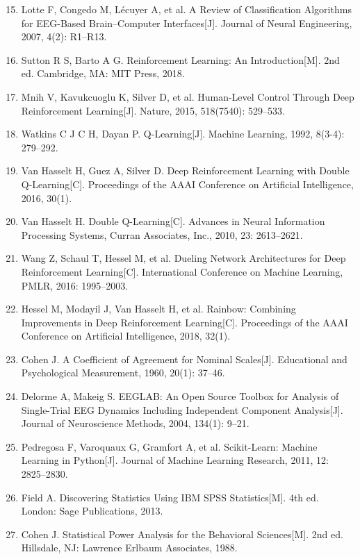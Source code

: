 \documentclass[12pt,a4paper]{ctexart}
\begin{document}
\begin{enumerate}
  \setcounter{enumi}{14}
  \item Lotte F, Congedo M, Lécuyer A, et al. A Review of Classification Algorithms for EEG-Based Brain--Computer Interfaces[J]. Journal of Neural Engineering, 2007, 4(2): R1--R13.
  \item Sutton R S, Barto A G. Reinforcement Learning: An Introduction[M]. 2nd ed. Cambridge, MA: MIT Press, 2018.
  \item Mnih V, Kavukcuoglu K, Silver D, et al. Human-Level Control Through Deep Reinforcement Learning[J]. Nature, 2015, 518(7540): 529--533.
  \item Watkins C J C H, Dayan P. Q-Learning[J]. Machine Learning, 1992, 8(3-4): 279--292.
  \item Van Hasselt H, Guez A, Silver D. Deep Reinforcement Learning with Double Q-Learning[C]. Proceedings of the AAAI Conference on Artificial Intelligence, 2016, 30(1).
  \item Van Hasselt H. Double Q-Learning[C]. Advances in Neural Information Processing Systems, Curran Associates, Inc., 2010, 23: 2613--2621.
  \item Wang Z, Schaul T, Hessel M, et al. Dueling Network Architectures for Deep Reinforcement Learning[C]. International Conference on Machine Learning, PMLR, 2016: 1995--2003.
  \item Hessel M, Modayil J, Van Hasselt H, et al. Rainbow: Combining Improvements in Deep Reinforcement Learning[C]. Proceedings of the AAAI Conference on Artificial Intelligence, 2018, 32(1).
  \item Cohen J. A Coefficient of Agreement for Nominal Scales[J]. Educational and Psychological Measurement, 1960, 20(1): 37--46.
  \item Delorme A, Makeig S. EEGLAB: An Open Source Toolbox for Analysis of Single-Trial EEG Dynamics Including Independent Component Analysis[J]. Journal of Neuroscience Methods, 2004, 134(1): 9--21.
  \item Pedregosa F, Varoquaux G, Gramfort A, et al. Scikit-Learn: Machine Learning in Python[J]. Journal of Machine Learning Research, 2011, 12: 2825--2830.
  \item Field A. Discovering Statistics Using IBM SPSS Statistics[M]. 4th ed. London: Sage Publications, 2013.
  \item Cohen J. Statistical Power Analysis for the Behavioral Sciences[M]. 2nd ed. Hillsdale, NJ: Lawrence Erlbaum Associates, 1988.
\end{enumerate}
\end{document}
